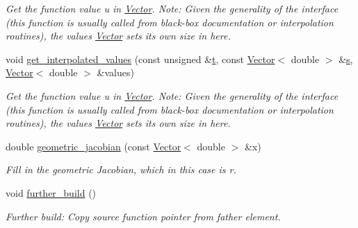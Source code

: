 \begin{DoxyCompactItemize}
\begin{DoxyCompactList}\small\item\em Get the function value u in \hyperlink{classoomph_1_1Vector}{Vector}. Note\+: Given the generality of the interface (this function is usually called from black-\/box documentation or interpolation routines), the values \hyperlink{classoomph_1_1Vector}{Vector} sets its own size in here. \end{DoxyCompactList}\item 
void \hyperlink{classoomph_1_1RefineableGeneralisedAxisymAdvectionDiffusionEquations_a2f7d7da51b9088a7e306692f709f9eed}{get\+\_\+interpolated\+\_\+values} (const unsigned \&\hyperlink{cfortran_8h_af6f0bd3dc13317f895c91323c25c2b8f}{t}, const \hyperlink{classoomph_1_1Vector}{Vector}$<$ double $>$ \&\hyperlink{cfortran_8h_ab7123126e4885ef647dd9c6e3807a21c}{s}, \hyperlink{classoomph_1_1Vector}{Vector}$<$ double $>$ \&values)
\begin{DoxyCompactList}\small\item\em Get the function value u in \hyperlink{classoomph_1_1Vector}{Vector}. Note\+: Given the generality of the interface (this function is usually called from black-\/box documentation or interpolation routines), the values \hyperlink{classoomph_1_1Vector}{Vector} sets its own size in here. \end{DoxyCompactList}\item 
double \hyperlink{classoomph_1_1RefineableGeneralisedAxisymAdvectionDiffusionEquations_a56cf6ea0f73a5a3fb80e44d56c31f852}{geometric\+\_\+jacobian} (const \hyperlink{classoomph_1_1Vector}{Vector}$<$ double $>$ \&x)
\begin{DoxyCompactList}\small\item\em Fill in the geometric Jacobian, which in this case is r. \end{DoxyCompactList}\item 
void \hyperlink{classoomph_1_1RefineableGeneralisedAxisymAdvectionDiffusionEquations_a7a664e8931def11ab00e8f15140f2df2}{further\+\_\+build} ()
\begin{DoxyCompactList}\small\item\em Further build\+: Copy source function pointer from father element. \end{DoxyCompactList}\end{DoxyCompactItemize}
